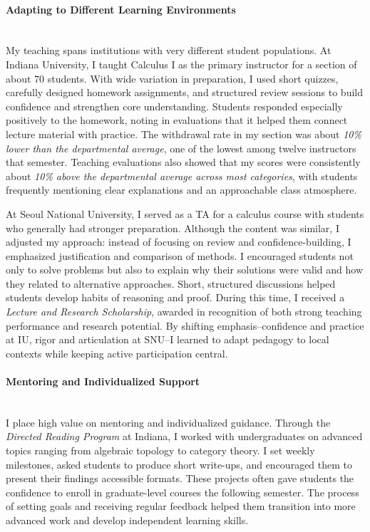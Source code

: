 \documentclass[11pt]{article}
\begin{document}
\paragraph{Adapting to Different Learning Environments} \quad \\
My teaching spans institutions with very different student populations.
At Indiana University, I taught Calculus I as the primary instructor for a section of about 70 students.
With wide variation in preparation, I used short quizzes, carefully designed homework assignments, and structured review sessions to build confidence and strengthen core understanding. 
Students responded especially positively to the homework, noting in evaluations that it helped them connect lecture material with practice.
The withdrawal rate in my section was about \emph{10\% lower than the departmental average}, one of the lowest among twelve instructors that semester. Teaching evaluations also showed that my scores were consistently about \emph{10\% above the departmental average across most categories}, with students frequently mentioning clear explanations and an approachable class atmosphere.

At Seoul National University, I served as a TA for a calculus course with students who generally had stronger preparation. 
Although the content was similar, I adjusted my approach: instead of focusing on review and confidence-building, I emphasized justification and comparison of methods. 
I encouraged students not only to solve problems but also to explain why their solutions were valid and how they related to alternative approaches. 
Short, structured discussions helped students develop habits of reasoning and proof. 
During this time, I received a \emph{Lecture and Research Scholarship}, awarded in recognition of both strong teaching performance and research potential.
By shifting emphasis--confidence and practice at IU, rigor and articulation at SNU--I learned to adapt pedagogy to local contexts while keeping active participation central.


\paragraph{Mentoring and Individualized Support}\quad \\
I place high value on mentoring and individualized guidance.
Through the \emph{Directed Reading Program} at Indiana, I worked with undergraduates on advanced topics ranging from algebraic topology to category theory.
I set weekly milestones, asked students to produce short write-ups, and encouraged them to present their findings accessible formats.
These projects often gave students the confidence to enroll in graduate-level courses the following semester.
The process of setting goals and receiving regular feedback helped them transition into more advanced work and develop independent learning skills.
\end{document}
